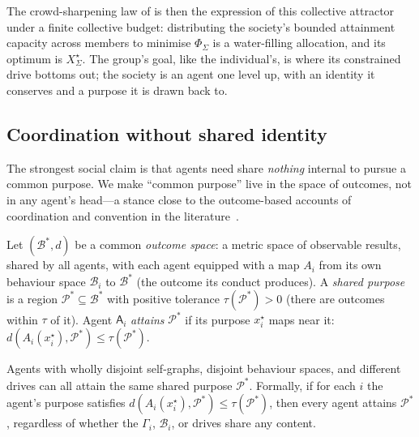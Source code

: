 \documentclass[11pt,twocolumn,a4paper]{article}
\newcommand{\Agent}{\mathsf{A}}
\newcommand{\Self}{\Gamma}          %
\newcommand{\Beh}{\mathcal{B}}       %
\newcommand{\Purp}{\mathcal{P}}      %
\newcommand{\Soc}{\Sigma}            %
\newcommand{\dist}{d}
\begin{document}
\begin{remark}
\label{rem:waterfill}
The crowd-sharpening law of  is then the expression of this
collective attractor under a finite collective budget: distributing the
society's bounded attainment capacity across members to minimise
$\Phi_\Soc$ is a water-filling allocation, and its optimum is
$X^\star_\Soc$. The group's goal, like the individual's, is where its
constrained drive bottoms out; the society is an agent one level up, with
an identity it conserves and a purpose it is drawn back to.
\end{remark}

\subsection{Coordination without shared identity}
\label{sec:coordwithout}

The strongest social claim is that agents need share \emph{nothing}
internal to pursue a common purpose. We make ``common purpose'' live in
the space of outcomes, not in any agent's head---a stance close to the
outcome-based accounts of coordination and convention in the
literature~\cite{schelling1960,lewis1969,aumann1976}.

\begin{definition}
\label{def:outcome}
Let $(\Beh^\ast,\dist)$ be a common \emph{outcome space}: a metric space
of observable results, shared by all agents, with each agent equipped with
a map $A_i$ from its own behaviour space $\Beh_i$ to $\Beh^\ast$ (the
outcome its conduct produces). A \emph{shared purpose} is a region
$\Purp^\ast\subseteq\Beh^\ast$ with positive tolerance
$\tau(\Purp^\ast)>0$ (there are outcomes within $\tau$ of it). Agent
$\Agent_i$ \emph{attains} $\Purp^\ast$ if its purpose $x^\star_i$ maps
near it: $\dist(A_i(x^\star_i),\Purp^\ast)\le\tau(\Purp^\ast)$.
\end{definition}

\begin{theorem}
\label{thm:coord}
Agents with wholly disjoint self-graphs, disjoint behaviour spaces, and
different drives can all attain the same shared purpose
$\Purp^\ast$. Formally, if for each $i$ the agent's purpose satisfies
$\dist(A_i(x^\star_i),\Purp^\ast)\le\tau(\Purp^\ast)$, then every agent
attains $\Purp^\ast$, regardless of whether the $\Self_i$, $\Beh_i$, or
drives share any content.
\end{theorem}
\end{document}
